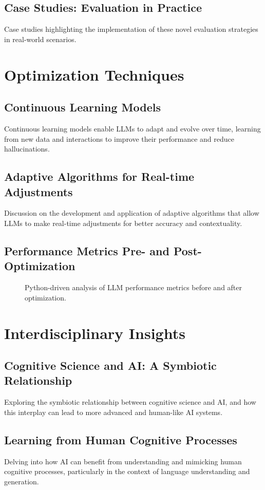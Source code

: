 \documentclass{article}
\begin{document}
\subsection{Case Studies: Evaluation in Practice}
Case studies highlighting the implementation of these novel evaluation strategies in real-world scenarios.

\section{Optimization Techniques}
\subsection{Continuous Learning Models}
Continuous learning models enable LLMs to adapt and evolve over time, learning from new data and interactions to improve their performance and reduce hallucinations.

\subsection{Adaptive Algorithms for Real-time Adjustments}
Discussion on the development and application of adaptive algorithms that allow LLMs to make real-time adjustments for better accuracy and contextuality.

\subsection{Performance Metrics Pre- and Post-Optimization}
\begin{figure}[h]
\centering

\caption{Python-driven analysis of LLM performance metrics before and after optimization.}
\label{fig:performance-metrics}
\end{figure}

\section{Interdisciplinary Insights}
\subsection{Cognitive Science and AI: A Symbiotic Relationship}
Exploring the symbiotic relationship between cognitive science and AI, and how this interplay can lead to more advanced and human-like AI systems.

\subsection{Learning from Human Cognitive Processes}
Delving into how AI can benefit from understanding and mimicking human cognitive processes, particularly in the context of language understanding and generation.
\end{document}
